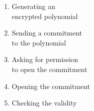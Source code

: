 \begin{enumerate}
    \item Generating an \\encrypted polynomial
    \item Sending a commitment \\to the polynomial
    \item Asking for permission \\to open the commitment
    \item Opening the commitment
    \item Checking the validity
\end{enumerate}